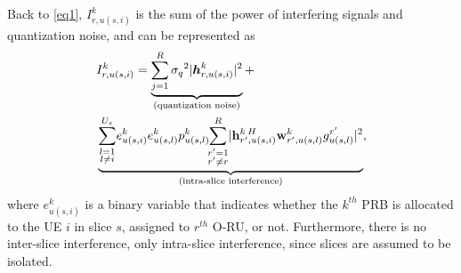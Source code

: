 \documentclass[lettersize,journal]{IEEEtran}
\begin{document}
Back to \eqref{eq1}, $I_{r,u(s,i)}^{k}$ is the sum of the power of interfering signals and quantization noise, and can be represented as 
\begin{align}\label{eqI}
&I_{r,u(s,i)}^{k} =\underbrace{  \sum_{j=1}^{{R}} {\sigma_q}^2 |\boldsymbol{h}_{r,{u(s,i)}}^k|^2 }_{\text{(quantization noise)}} + \nonumber\\
 &\underbrace{\sum_{\substack{l=1 \\ l\neq i}}^{{U}_{s}}\! e^{k}_{u(s,i)}e^{k}_{u(s,l)}  p_{u(s,l)}^{k}\!\!\sum_{\substack{r'=1 \\ r'\neq r}}^{R}\!|{\bold{h}_{r',u(s,i)}^{k \: H}} \bold{w}_{r',u(s,l)}^{k} g_{u(s,l)}^{r'}|^2}_{\text{(intra-slice interference)}},
\end{align}
where $e^{k}_{u(s,i)}$ is a binary variable that indicates whether the $k^{th}$ PRB is allocated to the UE $i$ in slice $s$, assigned to $r^{th}$ O-RU, or not. %
Furthermore, there is no inter-slice interference, only intra-slice interference, since slices are assumed to be isolated. 
\end{document}
